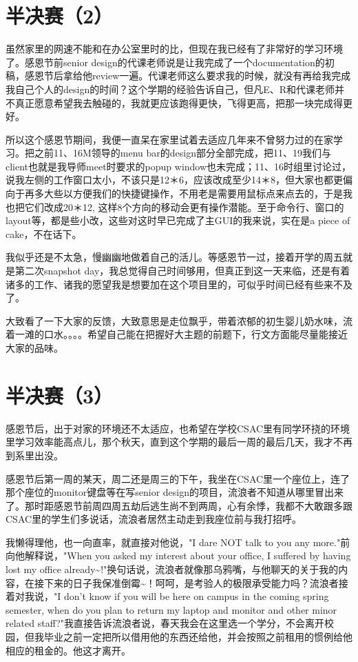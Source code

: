\documentclass[12pt]{book}
\begin{document}
\section{半决赛（2）}
\label{sec-35-2}
虽然家里的网速不能和在办公室里时的比，但现在我已经有了非常好的学习环境了。感恩节前senior design的代课老师说是让我完成了一个documentation的初稿，感恩节后拿给他review一遍。代课老师这么要求我的时候，就没有再给我完成我自己个人的design的时间？这个学期的经验告诉自己，但凡E、R和代课老师并不真正愿意希望我去触碰的，我就更应该跑得更快，飞得更高，把那一块完成得更好。

所以这个感恩节期间，我便一直呆在家里试着去适应几年来不曾努力过的在家学习。把之前11、16M领导的menu bar的design部分全部完成，把11、19我们与client也就是我导师meet时要求的popup window也未完成；11、16时组里讨论过，说我左侧的工作窗口太小，不该只是12＊6，应该改成至少14＊8，但大家也都更偏向于再多大些以方便我们的快捷键操作，不用老是需要用鼠标点来点去的，于是我也把它们改成20＊12, 这样8个方向的移动会更有操作潜能。至于命令行、窗口的layout等，都是些小改，这些对这时早已完成了主GUI的我来说，实在是a piece of cake，不在话下。

我似乎还是不太急，慢幽幽地做着自己的活儿。等感恩节一过，接着开学的周五就是第二次snapshot day，我总觉得自己时间够用，但真正到这一天来临，还是有着诸多的工作、诸我的愿望我是想要加在这个项目里的，可似乎时间已经有些来不及了。

大致看了一下大家的反馈，大致意思是走位飘乎，带着浓郁的初生婴儿奶水味，流着一滩的口水。。。。希望自己能在把握好大主题的前题下，行文方面能尽量能接近大家的品味。
\section{半决赛（3）}
\label{sec-35-3}
感恩节后，出于对家的环境还不太适应，也希望在学校CSAC里有同学环挠的环境里学习效率能高点儿，那个秋天，直到这个学期的最后一周的最后几天，我才不再到系里出没。

感恩节后第一周的某天，周二还是周三的下午，我坐在CSAC里一个座位上，连了那个座位的monitor键盘等在写senior design的项目，流浪者不知道从哪里冒出来了。那时距感恩节前周四周五劫后逃生尚不到两周，心有余悸，我都不大敢跟多跟CSAC里的学生们多说话，流浪者居然主动走到我座位前与我打招呼。

我懒得理他，也一向直率，就直接对他说，"I dare NOT talk to you any more."前向他解释说，"When you asked my interest about your office, I suffered by having lost my office already\textasciitilde{}!"换句话说，流浪者就像那乌鸦嘴，与他聊天的关于我的内容，在接下来的日子我保准倒霉\textasciitilde{}！呵呵，是考验人的极限承受能力吗？流浪者接着对我说，"I don't know if you will be here on campus in the coming spring semester, when do you plan to return my laptop and monitor and other minor related staff?"我直接告诉流浪者说，春天我会在这里选一个学分，不会离开校园，但我毕业之前一定把所以借用他的东西还给他，并会按照之前租用的惯例给他相应的租金的。他这才离开。
\end{document}
